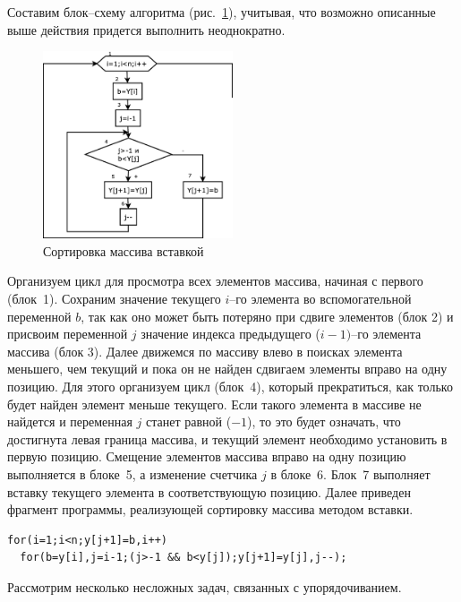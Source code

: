 Составим блок–схему алгоритма (рис.~\ref{ch05:refDrawing13}), учитывая, что возможно описанные выше действия придется
выполнить неоднократно.

\begin{figure}[htb]
\begin{center}
\includegraphics[width=0.5\textwidth]{img/ris_5_14}
\caption{Сортировка массива вставкой}
\label{ch05:refDrawing13}
\end{center}
\end{figure}


 Организуем цикл для просмотра всех элементов массива, начиная с первого (блок~1). Сохраним значение текущего
$i$–го элемента во вспомогательной переменной $b$, так как оно может быть потеряно
при сдвиге элементов (блок 2) и присвоим переменной $j$ значение индекса предыдущего
($i-1)$–го элемента массива (блок 3). Далее движемся по массиву влево в поисках элемента меньшего, чем
текущий и пока он не найден сдвигаем элементы вправо на одну позицию. Для этого организуем цикл (блок~4), который
прекратиться, как только будет найден элемент меньше текущего. Если такого элемента в массиве не найдется и переменная
$j$ станет равной ($-1$), то это будет означать, что достигнута левая граница массива, и текущий элемент
необходимо установить в первую позицию. Смещение элементов массива вправо на одну позицию выполняется в блоке~5, а
изменение счетчика $j$ в блоке~6. Блок~7 выполняет вставку текущего элемента в соответствующую
позицию.
Далее приведен фрагмент программы, реализующей сортировку массива методом вставки.
\begin{lstlisting}
for(i=1;i<n;y[j+1]=b,i++) 
  for(b=y[i],j=i-1;(j>-1 && b<y[j]);y[j+1]=y[j],j--);
\end{lstlisting}

Рассмотрим несколько несложных задач, связанных с упорядочиванием.


